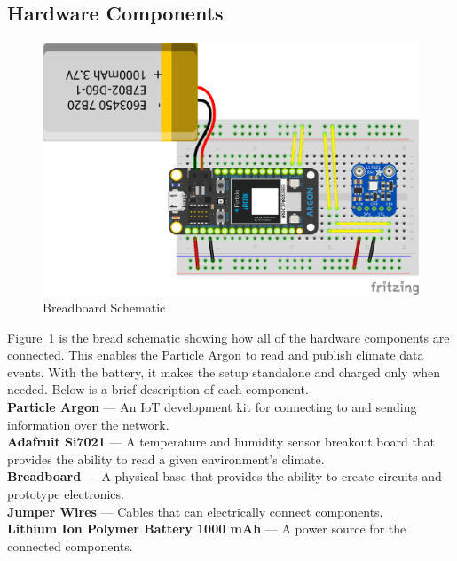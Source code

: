 \documentclass{article}
\begin{document}
\subsection{Hardware Components}
\label{section:hardware}
\begin{figure}[H]
    \center
    \includegraphics[width=\textwidth]{images/breadboard-schematic.png}
    \caption{Breadboard Schematic}
    \label{fig:breadboard_schematic}
\end{figure}

Figure~\ref{fig:breadboard_schematic} is the bread schematic showing how all of the hardware components are connected. This enables the Particle Argon to read and publish climate data events. With the battery, it makes the setup standalone and charged only when needed. Below is a brief description of each component.\\

\textbf{Particle Argon} — An IoT development kit for connecting to and sending information over the network.\\

\textbf{Adafruit Si7021} — A temperature and humidity sensor breakout board that provides the ability to read a given environment's climate.\\

\textbf{Breadboard} — A physical base that provides the ability to create circuits and prototype electronics.\\

\textbf{Jumper Wires} — Cables that can electrically connect components.\\

\textbf{Lithium Ion Polymer Battery 1000 mAh} — A power source for the connected components.
\end{document}
